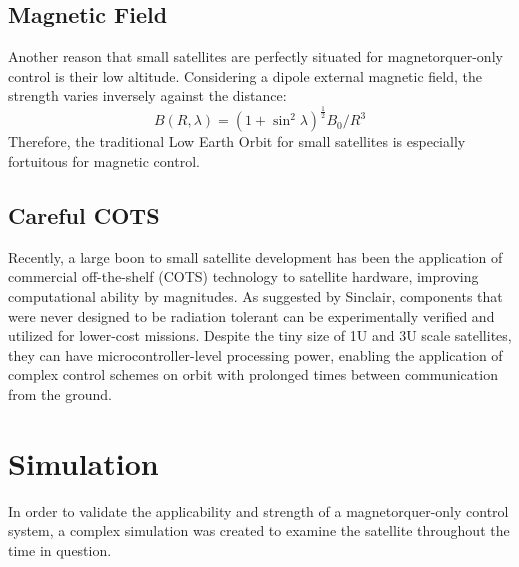 \documentclass[letterpaper, preprint, paper,11pt]{IAA-AAS}	%
\begin{document}
\subsection{Magnetic Field}
Another reason that small satellites are perfectly situated for magnetorquer-only control is their low altitude. Considering a dipole external magnetic field, the strength varies inversely against the distance:
\begin{equation}
	\label{eq:3}
	B(R,\lambda) = (1+\sin^2\lambda)^\frac{1}{2}B_0/R^3
\end{equation}
Therefore, the traditional Low Earth Orbit for small satellites is especially fortuitous for magnetic control.


\subsection{Careful COTS}
Recently, a large boon to small satellite development has been the application of commercial off-the-shelf (COTS) technology to satellite hardware, improving computational ability by magnitudes. As suggested by Sinclair\cite{sinclair2013}, components that were never designed to be radiation tolerant can be experimentally verified and utilized for lower-cost missions. Despite the tiny size of 1U and 3U scale satellites, they can have microcontroller-level processing power, enabling the application of complex control schemes on orbit with prolonged times between communication from the ground.

\section{Simulation}
In order to validate the applicability and strength of a magnetorquer-only control system, a complex simulation was created to examine the satellite throughout the time in question. 
\end{document}
